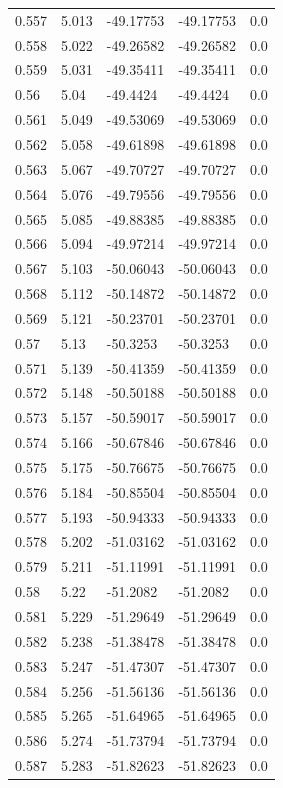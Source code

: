\begin{tabular}{lllll}
0.557 & 5.013 & -49.17753 & -49.17753 & 0.0 \\
0.558 & 5.022 & -49.26582 & -49.26582 & 0.0 \\
0.559 & 5.031 & -49.35411 & -49.35411 & 0.0 \\
0.56 & 5.04 & -49.4424 & -49.4424 & 0.0 \\
0.561 & 5.049 & -49.53069 & -49.53069 & 0.0 \\
0.562 & 5.058 & -49.61898 & -49.61898 & 0.0 \\
0.563 & 5.067 & -49.70727 & -49.70727 & 0.0 \\
0.564 & 5.076 & -49.79556 & -49.79556 & 0.0 \\
0.565 & 5.085 & -49.88385 & -49.88385 & 0.0 \\
0.566 & 5.094 & -49.97214 & -49.97214 & 0.0 \\
0.567 & 5.103 & -50.06043 & -50.06043 & 0.0 \\
0.568 & 5.112 & -50.14872 & -50.14872 & 0.0 \\
0.569 & 5.121 & -50.23701 & -50.23701 & 0.0 \\
0.57 & 5.13 & -50.3253 & -50.3253 & 0.0 \\
0.571 & 5.139 & -50.41359 & -50.41359 & 0.0 \\
0.572 & 5.148 & -50.50188 & -50.50188 & 0.0 \\
0.573 & 5.157 & -50.59017 & -50.59017 & 0.0 \\
0.574 & 5.166 & -50.67846 & -50.67846 & 0.0 \\
0.575 & 5.175 & -50.76675 & -50.76675 & 0.0 \\
0.576 & 5.184 & -50.85504 & -50.85504 & 0.0 \\
0.577 & 5.193 & -50.94333 & -50.94333 & 0.0 \\
0.578 & 5.202 & -51.03162 & -51.03162 & 0.0 \\
0.579 & 5.211 & -51.11991 & -51.11991 & 0.0 \\
0.58 & 5.22 & -51.2082 & -51.2082 & 0.0 \\
0.581 & 5.229 & -51.29649 & -51.29649 & 0.0 \\
0.582 & 5.238 & -51.38478 & -51.38478 & 0.0 \\
0.583 & 5.247 & -51.47307 & -51.47307 & 0.0 \\
0.584 & 5.256 & -51.56136 & -51.56136 & 0.0 \\
0.585 & 5.265 & -51.64965 & -51.64965 & 0.0 \\
0.586 & 5.274 & -51.73794 & -51.73794 & 0.0 \\
0.587 & 5.283 & -51.82623 & -51.82623 & 0.0 \\

\end{tabular}
